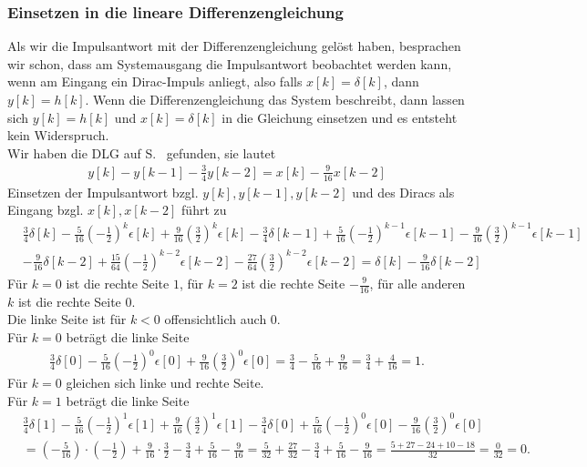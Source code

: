 \documentclass[11pt,a4paper,DIV=12]{scrartcl}
\begin{document}
\subsubsection{Einsetzen in die lineare Differenzengleichung}
Als wir die Impulsantwort mit der Differenzengleichung gelöst haben, besprachen
wir schon, dass am Systemausgang die Impulsantwort beobachtet werden kann, wenn
am Eingang ein Dirac-Impuls anliegt, also falls $x[k]=\delta[k]$, dann
$y[k]=h[k]$.
%
Wenn die Differenzengleichung das System beschreibt, dann lassen sich
$y[k]=h[k]$ und $x[k]=\delta[k]$ in die Gleichung einsetzen und es entsteht
kein Widerspruch.\\
%
Wir haben die DLG auf S.~\pageref{pg:DGL} gefunden, sie lautet
%
\begin{gather}
	y[k]-y[k-1]-\frac{3}{4}y[k-2]=x[k]-\frac{9}{16}x[k-2]
\end{gather}
%
%
Einsetzen der Impulsantwort bzgl. $y[k], y[k-1], y[k-2]$ und des Diracs als Eingang
bzgl. $x[k], x[k-2]$ führt zu
%
\begin{align}
	&\frac{3}{4}\delta[k]-\frac{5}{16}\left(-\frac{1}{2}\right)^k\epsilon[k]+\frac{9}{16}\left(\frac{3}{2}\right)^k\epsilon[k]-\frac{3}{4}\delta[k-1]+\frac{5}{16}\left(-\frac{1}{2}\right)^{k-1}\epsilon[k-1]-\frac{9}{16}\left(\frac{3}{2}\right)^{k-1}\epsilon[k-1]\nonumber \\
	&-\frac{9}{16}\delta[k-2]+\frac{15}{64}\left(-\frac{1}{2}\right)^{k-2}\epsilon[k-2]-\frac{27}{64}\left(\frac{3}{2}\right)^{k-2}\epsilon[k-2]=\delta[k]-\frac{9}{16}\delta[k-2]
\end{align}
%
%
%
Für $k=0$ ist die rechte Seite $1$, für $k=2$ ist die rechte Seite
$-\frac{9}{16}$, für alle anderen $k$ ist die rechte Seite $0$.\\
%
Die linke Seite ist für $k<0$ offensichtlich auch 0.\\
%
Für $k=0$ beträgt die linke Seite
%
%
\begin{align}
	\frac{3}{4}\delta[0]-\frac{5}{16}\left(-\frac{1}{2}\right)^0\epsilon[0]+\frac{9}{16}\left(\frac{3}{2}\right)^0\epsilon[0]
	=\frac{3}{4}-\frac{5}{16}+\frac{9}{16}=\frac{3}{4}+\frac{4}{16}=1.
\end{align}
%
%
Für $k=0$ gleichen sich linke und rechte Seite.\\
%
Für $k=1$ beträgt die linke Seite
%
%
\begin{align}
	&\frac{3}{4}\delta[1]-\frac{5}{16}\left(-\frac{1}{2}\right)^1\epsilon[1]+\frac{9}{16}\left(\frac{3}{2}\right)^1\epsilon[1]-\frac{3}{4}\delta[0]+\frac{5}{16}\left(-\frac{1}{2}\right)^{0}\epsilon[0]-\frac{9}{16}\left(\frac{3}{2}\right)^{0}\epsilon[0]\nonumber\nonumber \\
	&=\left(-\frac{5}{16}\right)\cdot\left(-\frac{1}{2}\right)+\frac{9}{16}\cdot\frac{3}{2}-\frac{3}{4}+\frac{5}{16}-\frac{9}{16}=\frac{5}{32}+\frac{27}{32}-\frac{3}{4}+\frac{5}{16}-\frac{9}{16}=\frac{5+27-24+10-18}{32}=\frac{0}{32}=0.
\end{align}
\end{document}

